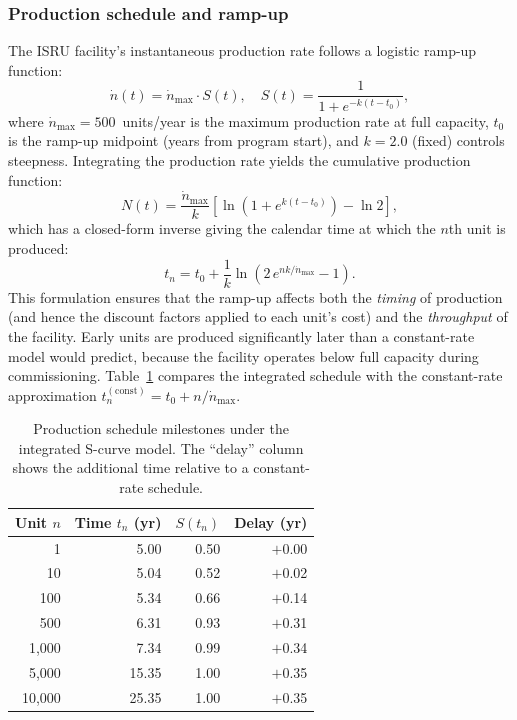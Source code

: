 \documentclass[preprint,12pt]{elsarticle}
\begin{document}
\subsubsection{Production schedule and ramp-up}

The ISRU facility's instantaneous production rate follows a logistic ramp-up function:
\begin{equation}
  \dot{n}(t) = \dot{n}_{\max} \cdot S(t), \quad S(t) = \frac{1}{1 + e^{-k(t - t_0)}},
  \label{eq:scurve}
\end{equation}
where $\dot{n}_{\max} = 500$~units/year is the maximum production rate at full capacity, $t_0$ is the ramp-up midpoint (years from program start), and $k = 2.0$ (fixed) controls steepness. Integrating the production rate yields the cumulative production function:
\begin{equation}
  N(t) = \frac{\dot{n}_{\max}}{k} \left[ \ln\!\left(1 + e^{k(t - t_0)}\right) - \ln 2 \right],
  \label{eq:cumulative_production}
\end{equation}
which has a closed-form inverse giving the calendar time at which the $n$th unit is produced:
\begin{equation}
  t_n = t_0 + \frac{1}{k} \ln\!\left(2\,e^{nk/\dot{n}_{\max}} - 1\right).
  \label{eq:production_schedule}
\end{equation}
This formulation ensures that the ramp-up affects both the \emph{timing} of production (and hence the discount factors applied to each unit's cost) and the \emph{throughput} of the facility. Early units are produced significantly later than a constant-rate model would predict, because the facility operates below full capacity during commissioning. Table~\ref{tab:production_schedule} compares the integrated schedule with the constant-rate approximation $t_n^{\mathrm{(const)}} = t_0 + n/\dot{n}_{\max}$.

\begin{table}[htbp]
\centering
\caption{Production schedule milestones under the integrated S-curve model. The ``delay'' column shows the additional time relative to a constant-rate schedule.}
\label{tab:production_schedule}
\small
\begin{tabular}{@{}rrrr@{}}
\toprule
Unit $n$ & Time $t_n$ (yr) & $S(t_n)$ & Delay (yr) \\
\midrule
1      & 5.00  & 0.50 & $+$0.00 \\
10     & 5.04  & 0.52 & $+$0.02 \\
100    & 5.34  & 0.66 & $+$0.14 \\
500    & 6.31  & 0.93 & $+$0.31 \\
1{,}000  & 7.34  & 0.99 & $+$0.34 \\
5{,}000  & 15.35 & 1.00 & $+$0.35 \\
10{,}000 & 25.35 & 1.00 & $+$0.35 \\
\bottomrule
\end{tabular}
\end{table}
\end{document}
